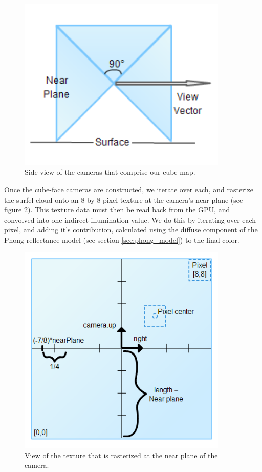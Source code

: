 \begin{figure}[h!]
   \centering
   \includegraphics[width=100mm]{../img/cubemap_sideview.png}
   \captionfonts
   \caption[Cubemap side-view]{Side view of the cameras that comprise our cube map.}
   \label{fig:cubemap_side}
\end{figure}

Once the cube-face cameras are constructed, we iterate over each, and rasterize the surfel cloud onto an 8 by 8 pixel texture at the camera's near plane (see figure \ref{fig:cubemap_texture}). This texture data must then be read back from the GPU, and convolved into one indirect illumination value. We do this by iterating over each pixel, and adding it's contribution, calculated using the diffuse component of the Phong reflectance model (see section \ref{sec:phong_model}) to the final color.

\begin{figure}[h!]
   \centering
   \includegraphics[width=100mm]{../img/jPixelCenter.png}
   \captionfonts
   \caption[Cubemap texture]{View of the texture that is rasterized at the near plane of the camera.}
   \label{fig:cubemap_texture}
\end{figure}


